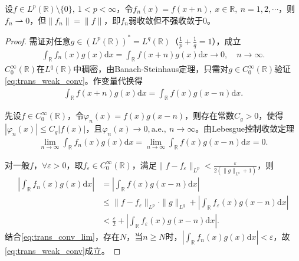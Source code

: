 \documentclass[../../main.tex]{subfiles}%
\begin{document}
\begin{example}[平移型弱收敛]

设$f\in L^p(\mathbb{R})\setminus\{0\},\ 1<p<\infty$，令$f_n(x)=f(x+n),\ x\in\mathbb{R},\ n=1,2,\cdots$，则$f_n\rightharpoonup0$，但$\|f_n\|=\|f\|$，即$f_n$弱收敛但不强收敛于$0$。
\end{example}
\begin{proof}
需证对任意$g\in(L^p(\mathbb{R}))^*=L^q(\mathbb{R})$（$\frac{1}{p}+\frac{1}{q}=1$），成立
\begin{align}
\int_{\mathbb{R}}f_n(x)g(x)\mathrm{d}x=\int_{\mathbb{R}}f(x+n)g(x)\mathrm{d}x\to0,\quad n\to\infty.\label{eq:trans_weak_conv}
\end{align}
$C_0^\infty(\mathbb{R})$在$L^q(\mathbb{R})$中稠密，由Banach-Steinhaus定理，只需对$g\in C_0^\infty(\mathbb{R})$验证\eqref{eq:trans_weak_conv}。作变量代换得
\begin{align*}
\int_{\mathbb{R}}f(x+n)g(x)\mathrm{d}x=\int_{\mathbb{R}}f(x)g(x-n)\mathrm{d}x.
\end{align*}

先设$f\in C_0^\infty(\mathbb{R})$，令$\varphi_n(x)=f(x)g(x-n)$，则存在常数$C_g>0$，使得$|\varphi_n(x)|\leqslant C_g|f(x)|$，且$\varphi_n(x)\to0,\text{a.e.},\ n\to\infty$。由Lebesgue控制收敛定理
\begin{align}
\lim\limits_{n\to\infty}\int_{\mathbb{R}}f_n(x)g(x)\mathrm{d}x=\lim\limits_{n\to\infty}\int_{\mathbb{R}}f(x)g(x-n)\mathrm{d}x=0.\label{eq:trans_conv_lim}
\end{align}

对一般$f$，$\forall\varepsilon>0$，取$f_\varepsilon\in C_0^\infty(\mathbb{R})$，满足$\|f-f_\varepsilon\|_{L^p}<\frac{\varepsilon}{2(\|g\|_{L^q}+1)}$，则
\begin{align*}
\left|\int_{\mathbb{R}}f_n(x)g(x)\mathrm{d}x\right|&=\left|\int_{\mathbb{R}}f(x)g(x-n)\mathrm{d}x\right|\\
&\leqslant\|f-f_\varepsilon\|_{L^p}\cdot\|g\|_{L^q}+\left|\int_{\mathbb{R}}f_\varepsilon(x)g(x-n)\mathrm{d}x\right|\\
&<\frac{\varepsilon}{2}+\left|\int_{\mathbb{R}}f_\varepsilon(x)g(x-n)\mathrm{d}x\right|.
\end{align*}
结合\eqref{eq:trans_conv_lim}，存在$N$，当$n\geqslant N$时，$\left|\int_{\mathbb{R}}f_n(x)g(x)\mathrm{d}x\right|<\varepsilon$，故\eqref{eq:trans_weak_conv}成立。
\end{proof}
\end{document}
